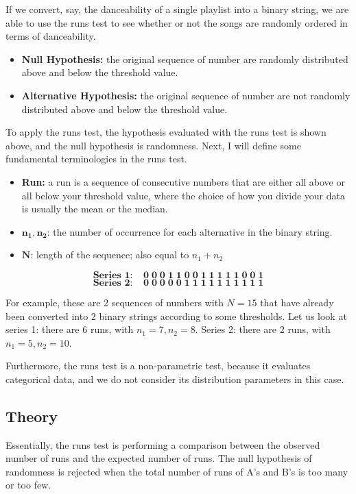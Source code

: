 \documentclass[12pt]{article}
\theoremstyle{plain}
\theoremstyle{definition}
\theoremstyle{remark}
\begin{document}
If we convert, say, the danceability of a single playlist into a binary string, we are able to use the runs test to see whether or not the songs are randomly ordered in terms of danceability.

\begin{itemize}
    \item \textbf{Null Hypothesis:} the original sequence of number are randomly distributed above and below the threshold value.
    \item \textbf{Alternative Hypothesis:} the original sequence of number are not randomly distributed above and below the threshold value.
\end{itemize}

To apply the runs test, the hypothesis evaluated with the runs test is shown above, and the null hypothesis is randomness. Next, I will define some fundamental terminologies in the runs test.

\begin{itemize}
    \item \textbf{Run:} a run is a sequence of consecutive numbers that are either all above or all below your threshold value, where the choice of how you divide your data is usually the mean or the median. 
    \item $\mathbf{n_1},\mathbf{n_2}$: the number of occurrence for each alternative in the binary string.
    \item $\mathbf N$: length of the sequence; also equal to $n_1+n_2$
\end{itemize}

\[\mathbf{\textbf{Series 1:}\;\;\;\;0\;0\;0\;1\;1\;0\;0\;1\;1\;1\;1\;1\;0\;0\;1}\]
\[\mathbf{\textbf{Series 2:}\;\;\;\;0\;0\;0\;0\;0\;1\;1\;1\;1\;1\;1\;1\;1\;1\;1}\]

For example, these are 2 sequences of numbers with $N=15$ that have already been converted into 2 binary strings according to some thresholds. Let us look at series 1: there are 6 runs, with $n_1=7,n_2=8$. Series 2: there are 2 runs, with $n_1=5,n_2=10$.

Furthermore, the runs test is a non-parametric test, because it evaluates categorical data, and we do not consider its distribution parameters in this case.

\newpage
\subsection{Theory}
Essentially, the runs test is performing a comparison between the observed number of runs and the expected number of runs. The null hypothesis of randomness is rejected when the total number of runs of A’s and B’s is too many or too few. 
\end{document}

